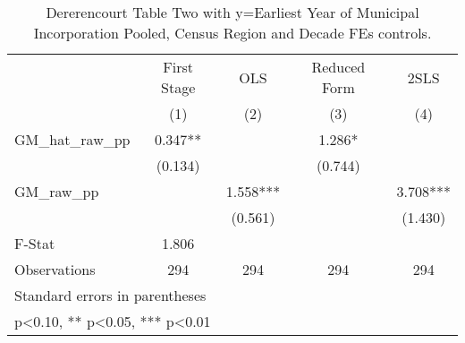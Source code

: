 \begin{table}[htbp]\centering
\def\sym#1{\ifmmode^{#1}\else\(^{#1}\)\fi}
\caption{Dererencourt Table Two with y=Earliest Year of Municipal Incorporation  Pooled, Census Region and Decade FEs controls.}
\begin{tabular}{l*{4}{c}}
\toprule
                    & First Stage   &         OLS   &Reduced Form   &        2SLS   \\
                    &\multicolumn{1}{c}{(1)}   &\multicolumn{1}{c}{(2)}   &\multicolumn{1}{c}{(3)}   &\multicolumn{1}{c}{(4)}   \\
\midrule
GM\_hat\_raw\_pp       &       0.347** &               &       1.286*  &               \\
                    &     (0.134)   &               &     (0.744)   &               \\
\addlinespace
GM\_raw\_pp           &               &       1.558***&               &       3.708***\\
                    &               &     (0.561)   &               &     (1.430)   \\
\midrule
F-Stat              &       1.806   &               &               &               \\
Observations        &         294   &         294   &         294   &         294   \\
\bottomrule
\multicolumn{5}{l}{\footnotesize Standard errors in parentheses}\\
\multicolumn{5}{l}{\footnotesize * p<0.10, ** p<0.05, *** p<0.01}\\
\end{tabular}
\end{table}
